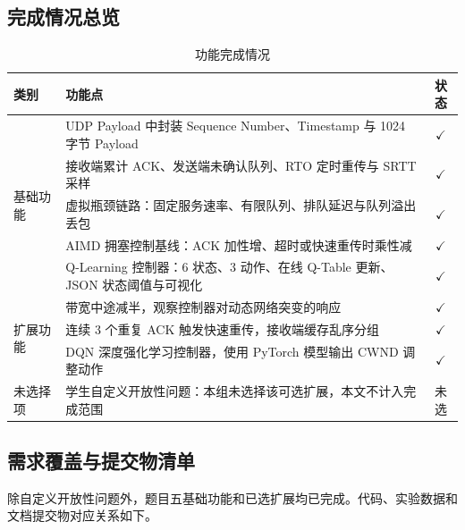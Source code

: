 \documentclass[a4paper, 11pt]{article}
\newcommand{\done}{$\checkmark$}
\begin{document}
\subsection{完成情况总览}
\begin{table}[H]
\centering
\caption{功能完成情况}
\small
\begin{tabularx}{\textwidth}{l X c}
\toprule
\textbf{类别} & \textbf{功能点} & \textbf{状态} \\
\midrule
\multirow{5}{*}{基础功能}
  & UDP Payload 中封装 Sequence Number、Timestamp 与 1024 字节 Payload & \done \\
  & 接收端累计 ACK、发送端未确认队列、RTO 定时重传与 SRTT 采样 & \done \\
  & 虚拟瓶颈链路：固定服务速率、有限队列、排队延迟与队列溢出丢包 & \done \\
  & AIMD 拥塞控制基线：ACK 加性增、超时或快速重传时乘性减 & \done \\
  & Q-Learning 控制器：6 状态、3 动作、在线 Q-Table 更新、JSON 状态阈值与可视化 & \done \\
\midrule
\multirow{3}{*}{扩展功能}
  & 带宽中途减半，观察控制器对动态网络突变的响应 & \done \\
  & 连续 3 个重复 ACK 触发快速重传，接收端缓存乱序分组 & \done \\
  & DQN 深度强化学习控制器，使用 PyTorch 模型输出 CWND 调整动作 & \done \\
\midrule
未选择项 & 学生自定义开放性问题：本组未选择该可选扩展，本文不计入完成范围 & 未选 \\
\bottomrule
\end{tabularx}
\end{table}

\subsection{需求覆盖与提交物清单}
除自定义开放性问题外，题目五基础功能和已选扩展均已完成。代码、实验数据和文档提交物对应关系如下。
\end{document}
